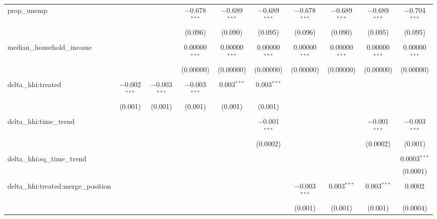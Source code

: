 \begin{table}[H]
{\begin{tabular}{@{\extracolsep{5pt}}lccccccccc}
  prop\_unemp &  &  & $-$0.678$^{***}$ & $-$0.689$^{***}$ & $-$0.689$^{***}$ & $-$0.678$^{***}$ & $-$0.689$^{***}$ & $-$0.689$^{***}$ & $-$0.704$^{***}$ \\  

   &  &  & (0.096) & (0.090) & (0.095) & (0.096) & (0.090) & (0.095) & (0.095) \\  

   & & & & & & & & & \\  

  median\_household\_income &  &  & 0.00000$^{***}$ & 0.00000$^{***}$ & 0.00000$^{***}$ & 0.00000$^{***}$ & 0.00000$^{***}$ & 0.00000$^{***}$ & 0.00000$^{***}$ \\  

   &  &  & (0.00000) & (0.00000) & (0.00000) & (0.00000) & (0.00000) & (0.00000) & (0.00000) \\  

   & & & & & & & & & \\  

  delta\_hhi:treated & $-$0.002$^{***}$ & $-$0.003$^{***}$ & $-$0.003$^{***}$ & 0.003$^{***}$ & 0.003$^{***}$ &  &  &  &  \\  

   & (0.001) & (0.001) & (0.001) & (0.001) & (0.001) &  &  &  &  \\  

   & & & & & & & & & \\  

  delta\_hhi:time\_trend &  &  &  &  & $-$0.001$^{***}$ &  &  & $-$0.001$^{***}$ & $-$0.003$^{***}$ \\  

   &  &  &  &  & (0.0002) &  &  & (0.0002) & (0.001) \\  

   & & & & & & & & & \\  

  delta\_hhi:sq\_time\_trend &  &  &  &  &  &  &  &  & 0.0003$^{***}$ \\  

   &  &  &  &  &  &  &  &  & (0.0001) \\  

   & & & & & & & & & \\  

  delta\_hhi:treated:merge\_position &  &  &  &  &  & $-$0.003$^{***}$ & 0.003$^{***}$ & 0.003$^{***}$ & 0.0002 \\  

   &  &  &  &  &  & (0.001) & (0.001) & (0.001) & (0.0004) \\  


\end{tabular}}
\end{table}
